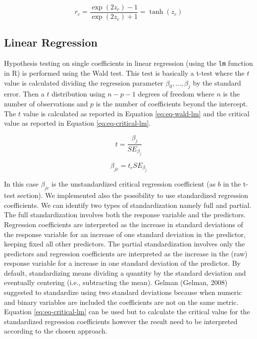 \documentclass[
  man]{apa7}
\begin{document}
\begin{equation}
    \label{eq:eq-bk-r}
    r_c = \frac{\exp(2z_c)-1}{\exp(2z_c)+1} = \operatorname{tanh}(z_c)
\end{equation}

\hypertarget{linear-regression}{%
\subsection{Linear Regression}\label{linear-regression}}

Hypothesis testing on single coefficients in linear regression (using the \texttt{lm} function in R) is performed using the Wald test. This test is basically a t-test where the \(t\) value is calculated dividing the regression parameter \(\beta_0, \dots, \beta_j\) by the standard error. Then a \(t\) distribution using \(n - p - 1\) degrees of freedom where \(n\) is the number of observations and \(p\) is the number of coefficients beyond the intercept. The \(t\) value is calculated as reported in Equation \eqref{eq:eq-wald-lm} and the critical value as reported in Equation \eqref{eq:eq-critical-lm}.

\begin{equation}
\label{eq:eq-wald-lm}
    t = \frac{\beta_j}{SE_{\beta_j}}
\end{equation}

\begin{equation}
\label{eq:eq-critical-lm}
    \beta_{jc} = t_c SE_{\beta_j}
\end{equation}

In this case \(\beta_{jc}\) is the unstandardized critical regression coefficient (as \(b\) in the t-test section). We implemented also the possibility to use standardized regression coefficients. We can identify two types of standardization namely full and partial. The full standardization involves both the response variable and the predictors. Regression coefficients are interpreted as the increase in standard deviations of the response variable for an increase of one standard deviation in the predictor, keeping fixed all other predictors. The partial standardization involves only the predictors and regression coefficients are interpreted as the increase in the (raw) response variable for a increase in one standard deviation of the predictor. By default, standardizing means dividing a quantity by the standard deviation and eventually centering (i.e., subtracting the mean). Gelman (Gelman, 2008) suggested to standardize using two standard deviations because when numeric and binary variables are included the coefficients are not on the same metric. Equation \eqref{eq:eq-critical-lm} can be used but to calculate the critical value for the standardized regression coefficients however the result need to be interpreted according to the chosen approach.
\end{document}

